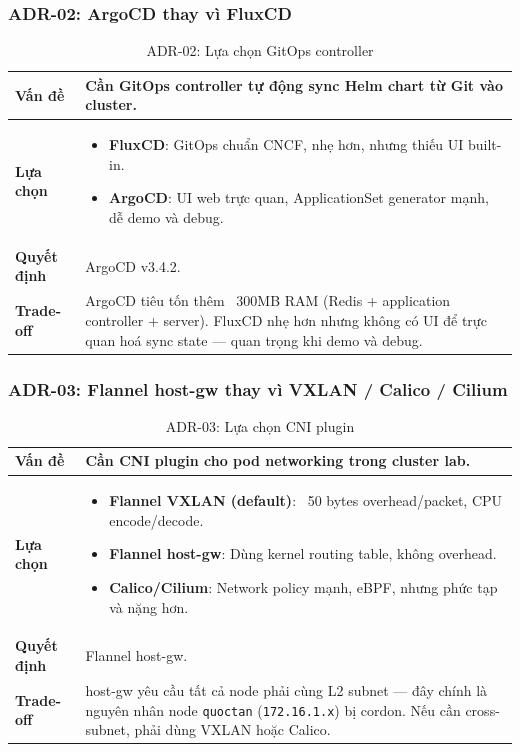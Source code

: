 \subsubsection*{ADR-02: ArgoCD thay vì FluxCD}

\begin{table}[H]
\centering
\renewcommand{\arraystretch}{1.3}
\begin{tabular}{|p{3cm}|p{12.5cm}|}
\hline
\textbf{Vấn đề} & Cần GitOps controller tự động sync Helm chart từ Git vào cluster. \\
\hline
\textbf{Lựa chọn} &
\begin{itemize}[noitemsep,topsep=0pt]
  \item \textbf{FluxCD}: GitOps chuẩn CNCF, nhẹ hơn, nhưng thiếu UI built-in.
  \item \textbf{ArgoCD}: UI web trực quan, ApplicationSet generator mạnh, dễ demo và debug.
\end{itemize} \\
\hline
\textbf{Quyết định} & ArgoCD v3.4.2. \\
\hline
\textbf{Trade-off} & ArgoCD tiêu tốn thêm ~300MB RAM (Redis + application controller + server). FluxCD nhẹ hơn nhưng không có UI để trực quan hoá sync state — quan trọng khi demo và debug. \\
\hline
\end{tabular}
\caption{ADR-02: Lựa chọn GitOps controller}
\end{table}

\subsubsection*{ADR-03: Flannel host-gw thay vì VXLAN / Calico / Cilium}

\begin{table}[H]
\centering
\renewcommand{\arraystretch}{1.3}
\begin{tabular}{|p{3cm}|p{12.5cm}|}
\hline
\textbf{Vấn đề} & Cần CNI plugin cho pod networking trong cluster lab. \\
\hline
\textbf{Lựa chọn} &
\begin{itemize}[noitemsep,topsep=0pt]
  \item \textbf{Flannel VXLAN (default)}: ~50 bytes overhead/packet, CPU encode/decode.
  \item \textbf{Flannel host-gw}: Dùng kernel routing table, không overhead.
  \item \textbf{Calico/Cilium}: Network policy mạnh, eBPF, nhưng phức tạp và nặng hơn.
\end{itemize} \\
\hline
\textbf{Quyết định} & Flannel host-gw. \\
\hline
\textbf{Trade-off} & host-gw yêu cầu tất cả node phải cùng L2 subnet — đây chính là nguyên nhân node \texttt{quoctan} (\texttt{172.16.1.x}) bị cordon. Nếu cần cross-subnet, phải dùng VXLAN hoặc Calico. \\
\hline
\end{tabular}
\caption{ADR-03: Lựa chọn CNI plugin}
\end{table}

